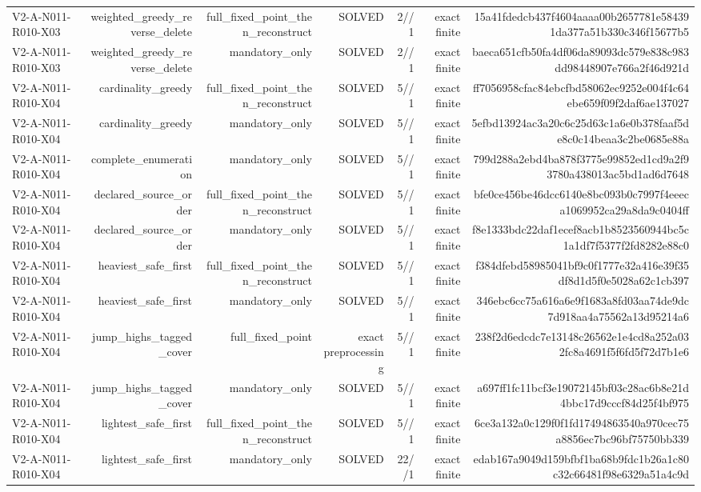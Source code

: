 {\begin{longtable}{lrrrrrr}
V2-A-N011-R010-X03 & weighted\_greedy\_reverse\_delete & full\_fixed\_point\_then\_reconstruct & SOLVED & 2//1 & exact finite & 15a41fdedcb437f4604aaaa00b2657781e584391da377a51b330c346f15677b5 \\
V2-A-N011-R010-X03 & weighted\_greedy\_reverse\_delete & mandatory\_only & SOLVED & 2//1 & exact finite & baeca651cfb50fa4df06da89093dc579e838c983dd98448907e766a2f46d921d \\
V2-A-N011-R010-X04 & cardinality\_greedy & full\_fixed\_point\_then\_reconstruct & SOLVED & 5//1 & exact finite & ff7056958cfac84ebcfbd58062ec9252e004f4c64ebe659f09f2daf6ae137027 \\
V2-A-N011-R010-X04 & cardinality\_greedy & mandatory\_only & SOLVED & 5//1 & exact finite & 5efbd13924ac3a20c6c25d63c1a6e0b378faaf5de8c0c14beaa3c2be0685e88a \\
V2-A-N011-R010-X04 & complete\_enumeration & mandatory\_only & SOLVED & 5//1 & exact finite & 799d288a2ebd4ba878f3775e99852ed1cd9a2f93780a438013ac5bd1ad6d7648 \\
V2-A-N011-R010-X04 & declared\_source\_order & full\_fixed\_point\_then\_reconstruct & SOLVED & 5//1 & exact finite & bfe0ce456be46dcc6140e8bc093b0c7997f4eeeca1069952ca29a8da9c0404ff \\
V2-A-N011-R010-X04 & declared\_source\_order & mandatory\_only & SOLVED & 5//1 & exact finite & f8e1333bdc22daf1ecef8acb1b8523560944bc5c1a1df7f5377f2fd8282e88c0 \\
V2-A-N011-R010-X04 & heaviest\_safe\_first & full\_fixed\_point\_then\_reconstruct & SOLVED & 5//1 & exact finite & f384dfebd58985041bf9c0f1777e32a416e39f35df8d1d5f0e5028a62c1cb397 \\
V2-A-N011-R010-X04 & heaviest\_safe\_first & mandatory\_only & SOLVED & 5//1 & exact finite & 346ebc6cc75a616a6e9f1683a8fd03aa74de9dc7d918aa4a75562a13d95214a6 \\
V2-A-N011-R010-X04 & jump\_highs\_tagged\_cover & full\_fixed\_point & exact preprocessing & 5//1 & exact finite & 238f2d6edcdc7e13148c26562e1e4cd8a252a032fc8a4691f5f6fd5f72d7b1e6 \\
V2-A-N011-R010-X04 & jump\_highs\_tagged\_cover & mandatory\_only & SOLVED & 5//1 & exact finite & a697ff1fc11bcf3e19072145bf03c28ac6b8e21d4bbc17d9cccf84d25f4bf975 \\
V2-A-N011-R010-X04 & lightest\_safe\_first & full\_fixed\_point\_then\_reconstruct & SOLVED & 5//1 & exact finite & 6ce3a132a0c129f0f1fd17494863540a970cec75a8856ec7bc96bf75750bb339 \\
V2-A-N011-R010-X04 & lightest\_safe\_first & mandatory\_only & SOLVED & 22//1 & exact finite & edab167a9049d159bfbf1ba68b9fdc1b26a1c80c32c66481f98e6329a51a4c9d \\

\end{longtable}}
